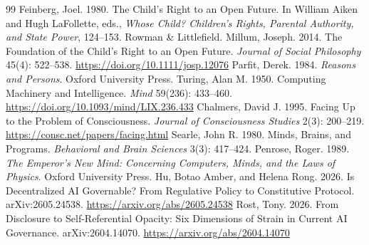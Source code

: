 \documentclass[11pt,a4paper,fontset=fandol]{ctexart}
\begin{document}
\begin{thebibliography}{99}
Feinberg, Joel. 1980. The Child's Right to an Open Future. In William Aiken and Hugh LaFollette, eds., \emph{Whose Child? Children's Rights, Parental Authority, and State Power}, 124--153. Rowman \& Littlefield.
Millum, Joseph. 2014. The Foundation of the Child's Right to an Open Future. \emph{Journal of Social Philosophy} 45(4): 522--538. \url{https://doi.org/10.1111/josp.12076}
Parfit, Derek. 1984. \emph{Reasons and Persons}. Oxford University Press.
Turing, Alan M. 1950. Computing Machinery and Intelligence. \emph{Mind} 59(236): 433--460. \url{https://doi.org/10.1093/mind/LIX.236.433}
Chalmers, David J. 1995. Facing Up to the Problem of Consciousness. \emph{Journal of Consciousness Studies} 2(3): 200--219. \url{https://consc.net/papers/facing.html}
Searle, John R. 1980. Minds, Brains, and Programs. \emph{Behavioral and Brain Sciences} 3(3): 417--424.
Penrose, Roger. 1989. \emph{The Emperor's New Mind: Concerning Computers, Minds, and the Laws of Physics}. Oxford University Press.
Hu, Botao Amber, and Helena Rong. 2026. Is Decentralized AI Governable? From Regulative Policy to Constitutive Protocol. arXiv:2605.24538. \url{https://arxiv.org/abs/2605.24538}
Rost, Tony. 2026. From Disclosure to Self-Referential Opacity: Six Dimensions of Strain in Current AI Governance. arXiv:2604.14070. \url{https://arxiv.org/abs/2604.14070}
\end{thebibliography}
\end{document}
